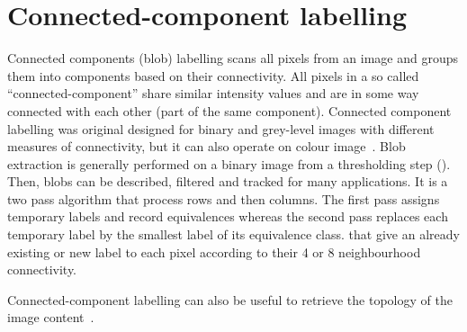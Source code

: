 \section{Connected-component labelling} %
\label{sec:ap:connected_component_labelling}
Connected components (blob) labelling scans all pixels from an image and groups them into components based on their connectivity.
All pixels in a so called ``connected-component'' share similar intensity values and are in some way connected with each other (part of the same component).
Connected component labelling was original designed for binary and grey-level images with different measures of connectivity, but it can also operate on colour image~\cite{dillencourt1992general}.
Blob extraction is generally performed on a binary image from a thresholding step ().
Then, blobs can be described, filtered and tracked for many applications.
It is a two pass algorithm that process rows and then columns.
The first pass assigns temporary labels and record equivalences whereas the second pass replaces each temporary label by the smallest label of its equivalence class. that give an already existing or new label to each pixel according to their 4 or 8 neighbourhood connectivity.

Connected-component labelling can also be useful to retrieve the topology of the image content~\cite{suzuki1985topological}.






